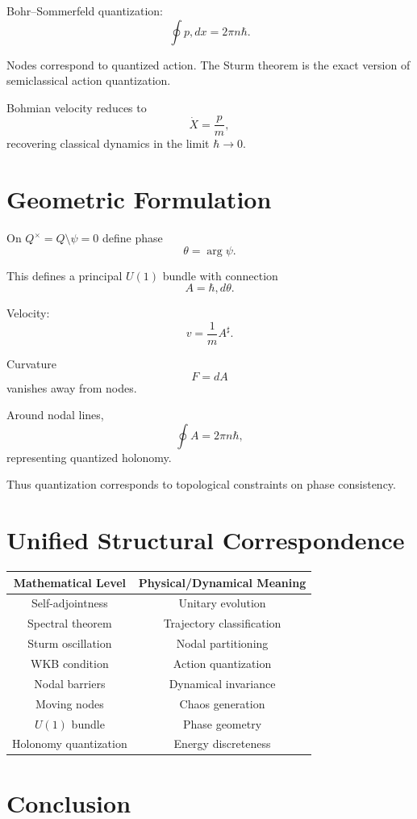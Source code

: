 \documentclass[11pt]{article}
\theoremstyle{plain}
\theoremstyle{definition}
\begin{document}
Bohr–Sommerfeld quantization:
\[
\oint p,dx = 2\pi n\hbar.
\]

Nodes correspond to quantized action.
The Sturm theorem is the exact version of semiclassical action quantization.

Bohmian velocity reduces to
\[
\dot X = \frac{p}{m},
\]
recovering classical dynamics in the limit $\hbar\to 0$.

\section{Geometric Formulation}

On $Q^\times = Q\setminus{\psi=0}$ define phase
\[
\theta = \arg\psi.
\]

This defines a principal $U(1)$ bundle with connection
\[
A = \hbar, d\theta.
\]

Velocity:
\[
v = \frac{1}{m}A^\sharp.
\]

Curvature
\[
F = dA
\]
vanishes away from nodes.

Around nodal lines,
\[
\oint A = 2\pi n\hbar,
\]
representing quantized holonomy.

Thus quantization corresponds to topological constraints on phase consistency.

\section{Unified Structural Correspondence}

\begin{center}
\begin{tabular}{|c|c|}
\hline
Mathematical Level & Physical/Dynamical Meaning \\
\hline
Self-adjointness & Unitary evolution \\
Spectral theorem & Trajectory classification \\
Sturm oscillation & Nodal partitioning \\
WKB condition & Action quantization \\
Nodal barriers & Dynamical invariance \\
Moving nodes & Chaos generation \\
$U(1)$ bundle & Phase geometry \\
Holonomy quantization & Energy discreteness \\
\hline
\end{tabular}
\end{center}

\section{Conclusion}
\end{document}
